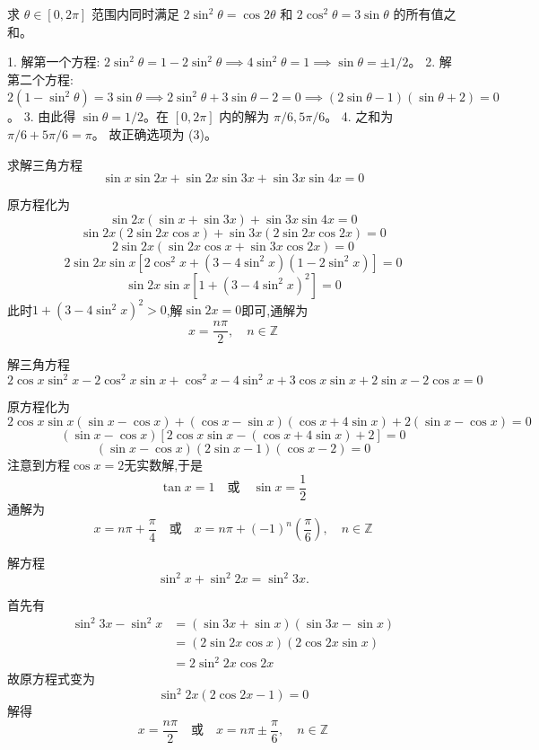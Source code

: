 \begin{questions}
    \question
求 $\theta \in [0, 2\pi]$ 范围内同时满足 $2\sin^2\theta = \cos 2\theta$ 和 $2\cos^2\theta = 3\sin\theta$ 的所有值之和。

\begin{solution}
1. 解第一个方程: $2\sin^2\theta = 1 - 2\sin^2\theta \implies 4\sin^2\theta = 1 \implies \sin\theta = \pm 1/2$。
2. 解第二个方程: $2(1-\sin^2\theta) = 3\sin\theta \implies 2\sin^2\theta + 3\sin\theta - 2 = 0 \implies (2\sin\theta - 1)(\sin\theta + 2) = 0$。
3. 由此得 $\sin\theta = 1/2$。在 $[0, 2\pi]$ 内的解为 $\pi/6, 5\pi/6$。
4. 之和为 $\pi/6 + 5\pi/6 = \pi$。
故正确选项为 (3)。
\end{solution}

    \question 求解三角方程
    \[
    \sin x\sin 2x+\sin 2x\sin 3x+\sin 3x\sin 4x=0
    \]
    \begin{solution}
        原方程化为
        \[
        \sin 2x(\sin x+\sin 3x)+\sin 3x\sin 4x=0
        \]
        \[
        \sin 2x(2\sin 2x\cos x)+\sin 3x(2\sin 2x\cos 2x)=0
        \]
        \[
        2\sin 2x(\sin 2x\cos x+\sin 3x\cos 2x)=0
        \]
        \[
        2\sin 2x \sin x \left[2\cos^2 x + (3-4\sin^2 x)(1-2\sin^2 x)\right]=0
        \]
        \[
        \sin 2x \sin x \left[1+(3-4\sin^2 x)^2\right]=0
        \]
        此时$1+(3-4\sin^2 x)^2>0$,解$\sin 2x=0$即可,通解为
        \[
        x=\frac{n\pi}{2},\quad n\in\mathbb{Z}
        \]
    \end{solution}

    \question 解三角方程
    \[
    2\cos x\sin^2 x-2\cos^2 x\sin x+\cos^2 x-4\sin^2 x+3\cos x\sin x+2\sin x-2\cos x=0
    \]
    \begin{solution}
        原方程化为
        \[
        2\cos x\sin x(\sin x -\cos x)+(\cos x -\sin x)(\cos x +4\sin x)+2(\sin x-\cos x)=0
        \]
        \[
        (\sin x-\cos x)\left[2\cos x\sin x-(\cos x +4\sin x)+2\right]=0
        \]
        \[
        (\sin x-\cos x)(2\sin x-1)(\cos x-2)=0
        \]
        注意到方程$\cos x=2$无实数解,于是
        \[
        \tan x = 1\quad \text{或} \quad \sin x=\frac{1}{2}
        \]
        通解为
        \[
        x=n\pi+\frac{\pi}{4} \quad \text{或} \quad x=n\pi +(-1)^n \left(\frac{\pi}{6}\right),\quad n\in\mathbb{Z}
        \]
    \end{solution}

    \question 解方程 
    \[
    \sin^2 x + \sin^2 2x = \sin^2 3x.
    \]
    \begin{solution}
        首先有
        \begin{align*}
        \sin^2 3x - \sin^2 x 
        &= (\sin 3x + \sin x)(\sin 3x - \sin x)\\
        &=(2 \sin 2x \cos x)(2 \cos 2x \sin x)\\
        &=2 \sin^2 2x \cos 2x
        \end{align*}
        故原方程式变为
        \[
        \sin^2 2x (2 \cos 2x - 1) = 0
        \]
        解得
        \[
        x = \frac{n\pi}{2} \quad \text{或} \quad x = n\pi \pm \frac{\pi}{6},\quad n \in \mathbb{Z}
        \]
    \end{solution}


\end{questions}
